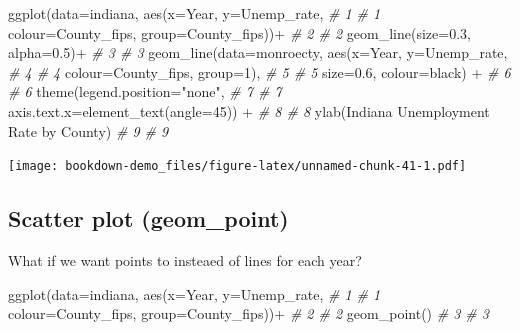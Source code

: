 \documentclass[
]{book}
\newenvironment{Shaded}{\begin{snugshade}}{\end{snugshade}}
\newcommand{\AttributeTok}[1]{\textcolor[rgb]{0.77,0.63,0.00}{#1}}
\newcommand{\CommentTok}[1]{\textcolor[rgb]{0.56,0.35,0.01}{\textit{#1}}}
\newcommand{\DecValTok}[1]{\textcolor[rgb]{0.00,0.00,0.81}{#1}}
\newcommand{\FloatTok}[1]{\textcolor[rgb]{0.00,0.00,0.81}{#1}}
\newcommand{\FunctionTok}[1]{\textcolor[rgb]{0.00,0.00,0.00}{#1}}
\newcommand{\NormalTok}[1]{#1}
\newcommand{\SpecialCharTok}[1]{\textcolor[rgb]{0.00,0.00,0.00}{#1}}
\newcommand{\StringTok}[1]{\textcolor[rgb]{0.31,0.60,0.02}{#1}}
\begin{document}
\begin{Shaded}
\begin{Highlighting}[]
\FunctionTok{ggplot}\NormalTok{(}\AttributeTok{data=}\NormalTok{indiana, }\FunctionTok{aes}\NormalTok{(}\AttributeTok{x=}\NormalTok{Year, }\AttributeTok{y=}\NormalTok{Unemp\_rate,          }\CommentTok{\# 1  \# 1}
    \AttributeTok{colour=}\NormalTok{County\_fips, }\AttributeTok{group=}\NormalTok{County\_fips))}\SpecialCharTok{+}            \CommentTok{\# 2  \# 2}
  \FunctionTok{geom\_line}\NormalTok{(}\AttributeTok{size=}\FloatTok{0.3}\NormalTok{, }\AttributeTok{alpha=}\FloatTok{0.5}\NormalTok{)}\SpecialCharTok{+}                       \CommentTok{\# 3  \# 3}
  \FunctionTok{geom\_line}\NormalTok{(}\AttributeTok{data=}\NormalTok{monroecty, }\FunctionTok{aes}\NormalTok{(}\AttributeTok{x=}\NormalTok{Year, }\AttributeTok{y=}\NormalTok{Unemp\_rate,   }\CommentTok{\# 4  \# 4}
    \AttributeTok{colour=}\NormalTok{County\_fips, }\AttributeTok{group=}\DecValTok{1}\NormalTok{),                       }\CommentTok{\# 5  \# 5}
    \AttributeTok{size=}\FloatTok{0.6}\NormalTok{, }\AttributeTok{colour=}\StringTok{\textquotesingle{}black\textquotesingle{}}\NormalTok{) }\SpecialCharTok{+}                         \CommentTok{\# 6  \# 6}
  \FunctionTok{theme}\NormalTok{(}\AttributeTok{legend.position=}\StringTok{"none"}\NormalTok{,                         }\CommentTok{\# 7  \# 7}
    \AttributeTok{axis.text.x=}\FunctionTok{element\_text}\NormalTok{(}\AttributeTok{angle=}\DecValTok{45}\NormalTok{)) }\SpecialCharTok{+}               \CommentTok{\# 8  \# 8}
  \FunctionTok{ylab}\NormalTok{(}\StringTok{\textquotesingle{}Indiana Unemployment Rate by County\textquotesingle{}}\NormalTok{)           }\CommentTok{\# 9  \# 9}
\end{Highlighting}
\end{Shaded}

\texttt{[image: bookdown-demo\_files/figure-latex/unnamed-chunk-41-1.pdf]}

\hypertarget{scatter-plot-geom_point}{%
\subsection{Scatter plot (geom\_point)}\label{scatter-plot-geom_point}}

What if we want points to insteaed of lines for each year?

\begin{Shaded}
\begin{Highlighting}[]
\FunctionTok{ggplot}\NormalTok{(}\AttributeTok{data=}\NormalTok{indiana, }\FunctionTok{aes}\NormalTok{(}\AttributeTok{x=}\NormalTok{Year, }\AttributeTok{y=}\NormalTok{Unemp\_rate,   }\CommentTok{\# 1  \# 1}
  \AttributeTok{colour=}\NormalTok{County\_fips, }\AttributeTok{group=}\NormalTok{County\_fips))}\SpecialCharTok{+}       \CommentTok{\# 2  \# 2}
  \FunctionTok{geom\_point}\NormalTok{()                                   }\CommentTok{\# 3  \# 3}
\end{Highlighting}
\end{Shaded}
\end{document}
